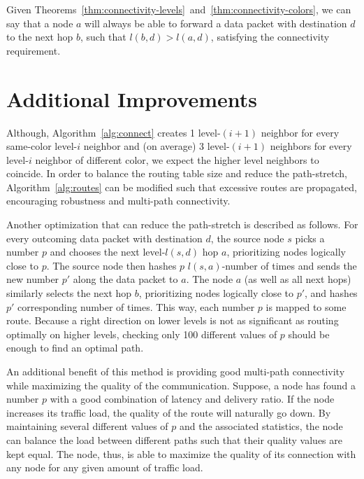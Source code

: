 \documentclass[14pt]{extarticle}
\theoremstyle{definition}
\begin{document}
Given Theorems~\ref{thm:connectivity-levels}~and~\ref{thm:connectivity-colors}, we can say that a node $a$ will always be able to forward a data packet with destination $d$ to the next hop $b$, such that $l(b,d) > l(a,d)$, satisfying the connectivity requirement.


\section{Additional Improvements}

Although, Algorithm~\ref{alg:connect} creates 1 level-$(i+1)$ neighbor for every same-color level-$i$ neighbor and (on average) 3 level-$(i+1)$ neighbors for every level-$i$ neighbor of different color, we expect the higher level neighbors to coincide. In order to balance the routing table size and reduce the path-stretch, Algorithm~\ref{alg:routes} can be modified such that excessive routes are propagated, encouraging robustness and multi-path connectivity.

Another optimization that can reduce the path-stretch is described as follows. For every outcoming data packet with destination $d$, the source node $s$ picks a number $p$ and chooses the next level-$l(s,d)$ hop $a$, prioritizing nodes logically close to $p$. The source node then hashes $p$ $l(s,a)$-number of times and sends the new number $p'$ along the data packet to $a$. The node $a$ (as well as all next hops) similarly selects the next hop $b$, prioritizing nodes logically close to $p'$, and hashes $p'$ corresponding number of times. This way, each number $p$ is mapped to some route. Because a right direction on lower levels is not as significant as routing optimally on higher levels, checking only 100 different values of $p$ should be enough to find an optimal path.

An additional benefit of this method is providing good multi-path connectivity while maximizing the quality of the communication. Suppose, a node has found a number $p$ with a good combination of latency and delivery ratio. If the node increases its traffic load, the quality of the route will naturally go down. By maintaining several different values of $p$ and the associated statistics, the node can balance the load between different paths such that their quality values are kept equal. The node, thus, is able to maximize the quality of its connection with any node for any given amount of traffic load.
\end{document}
